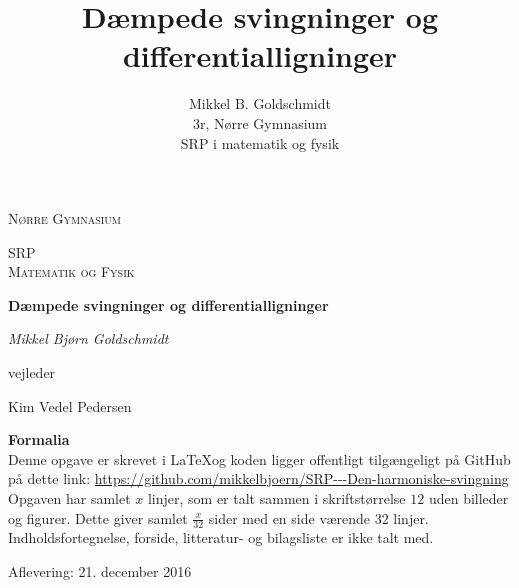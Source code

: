 \documentclass[11pt,a4paper,openany,oneside]{book}
\author{Mikkel B. Goldschmidt \\ 3r, Nørre Gymnasium \\ SRP i matematik og fysik}
\title{Dæmpede svingninger og differentialligninger}
\begin{document}


\begin{titlepage}
	\centering
	
	{\scshape\LARGE Nørre Gymnasium\par}
	\vspace{1cm}
	{\scshape\Large SRP \\ \large Matematik og Fysik\par}
	\vspace{1.5cm}
	{\huge\bfseries Dæmpede svingninger og differentialligninger\par}
	\vspace{2cm}
	{\Large\itshape Mikkel Bjørn Goldschmidt\par }
	
	
	\vfill
	vejleder\par
	Kim Vedel Pedersen
	\vfill

	\begin{framed}
	\textbf{Formalia}\\
	Denne opgave er skrevet i \LaTeX  og koden ligger offentligt tilgængeligt på GitHub på dette link: \url{https://github.com/mikkelbjoern/SRP---Den-harmoniske-svingning}\\
	
	Opgaven har samlet $x$ linjer, som er talt sammen i skriftstørrelse $12$ uden billeder og figurer. 
	Dette giver samlet $\frac{x}{32}$ sider med en side værende $32$ linjer. 
	Indholdsfortegnelse, forside, litteratur- og bilagsliste er ikke talt med.
	\end{framed}

	\vfill
	{\large Aflevering: 21. december 2016\par}
\end{titlepage}


\begin{singlespacing}
\tableofcontents
\end{singlespacing}
\pagebreak


























\end{document}

